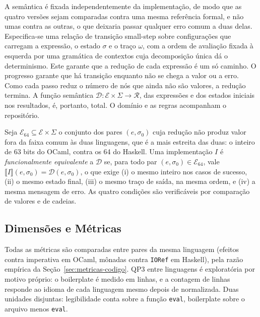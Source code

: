 \documentclass[12pt]{article}
\begin{document}
A semântica é fixada independentemente da implementação, de modo que as
quatro versões sejam comparadas contra uma mesma referência formal, e não
umas contra as outras, o que deixaria passar qualquer erro comum a duas delas.
Especifica-se uma relação de transição small-step sobre configurações
que carregam a expressão, o estado $\sigma$ e o traço $\omega$, com a ordem de
avaliação fixada à esquerda por uma gramática de contextos \cite{felleisen:92}
cuja decomposição única dá o determinismo. Este garante que a redução de cada
expressão é um só caminho. O progresso garante que há transição enquanto não se chega
a valor ou a erro. Como cada passo reduz o número de nós que ainda não são
valores, a redução termina. A função semântica
$\mathcal{D}:\mathcal{E}\times\Sigma\to\mathcal{R}$, das expressões e dos
estados iniciais nos resultados, é, portanto, total. O domínio e as regras
acompanham o repositório.

Seja $\mathcal{E}_{64}\subseteq\mathcal{E}\times\Sigma$ o conjunto dos pares
$(e,\sigma_0)$ cuja redução não produz valor fora da faixa comum às duas
linguagens, que é a mais estreita das duas: o inteiro de 63 bits do OCaml,
contra os 64 do Haskell. Uma implementação $I$ é \textit{funcionalmente
equivalente} a $\mathcal{D}$ se, para todo par
$(e,\sigma_0)\in\mathcal{E}_{64}$, vale
$\llbracket I \rrbracket(e,\sigma_0)=\mathcal{D}(e,\sigma_0)$, o que exige
(i) o mesmo inteiro nos casos de sucesso, (ii) o mesmo estado final, (iii) o
mesmo traço de saída, na mesma ordem, e (iv) a mesma mensagem de erro. As
quatro condições são verificáveis por comparação de valores e de cadeias.

\subsection{Dimensões e Métricas}\label{sec:metricas}

Todas as métricas são comparadas entre pares da mesma linguagem (efeitos
contra imperativa em OCaml, mônadas contra \texttt{IORef} em Haskell), pela
razão empírica da Seção~\ref{sec:metricas-codigo}. QP3 entre linguagens é
exploratória por motivo próprio: o boilerplate é medido em linhas, e
a contagem de linhas responde ao idioma de cada linguagem mesmo depois de
normalizada. Duas unidades disjuntas: legibilidade conta sobre a função
\texttt{eval}, boilerplate sobre o arquivo menos \texttt{eval}.
\end{document}
